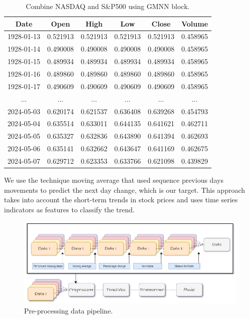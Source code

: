 \begin{table}[H]
	\centering
	\caption{Combine NASDAQ and S\&P500 using GMNN block.}
	\begin{tabular}{|c|c|c|c|c|c|}
		\hline
		\textbf{Date} & \textbf{Open} & \textbf{High} & \textbf{Low} & \textbf{Close} & \textbf{Volume} \\
		\hline
		1928-01-13    & 0.521913      & 0.521913      & 0.521913     & 0.521913       & 0.458965        \\
		\hline
		1928-01-14    & 0.490008      & 0.490008      & 0.490008     & 0.490008       & 0.458965        \\
		\hline
		1928-01-15    & 0.489934      & 0.489934      & 0.489934     & 0.489934       & 0.458965        \\
		\hline
		1928-01-16    & 0.489860      & 0.489860      & 0.489860     & 0.489860       & 0.458965        \\
		\hline
		1928-01-17    & 0.490609      & 0.490609      & 0.490609     & 0.490609       & 0.458965        \\
		\hline
		...           & ...           & ...           & ...          & ...            & ...             \\
		\hline
		2024-05-03    & 0.620174      & 0.621537      & 0.636408     & 0.639268       & 0.454793        \\
		\hline
		2024-05-04    & 0.635514      & 0.633011      & 0.644135     & 0.641621       & 0.462711        \\
		\hline
		2024-05-05    & 0.635327      & 0.632836      & 0.643890     & 0.641394       & 0.462693        \\
		\hline
		2024-05-06    & 0.635141      & 0.632662      & 0.643647     & 0.641169       & 0.462675        \\
		\hline
		2024-05-07    & 0.629712      & 0.623353      & 0.633766     & 0.621098       & 0.439829        \\
		\hline
	\end{tabular}
	\label{tab:final-data}
\end{table}

We use the technique moving average that used sequence previous days movements to
predict the next day change, which is our target. This approach takes into account
the short-term trends in stock prices and uses time series indicators as features
to classify the trend.

\begin{figure}[H]
	\centering
	\includegraphics[width=1\linewidth]{images/pipeline.eps}
	\caption{Pre-processing data pipeline.}
	\label{fig:pipeline}
\end{figure}

